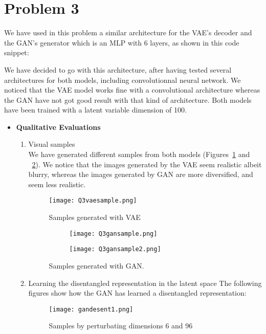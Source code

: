 \section*{Problem 3}
We have used in this problem a similar architecture for the VAE's decoder and the GAN's generator which is an MLP with 6 layers, as shown in this code snippet:


We have decided to go with this architecture, after having tested several architectures for both models, including convolutionnal neural network. We noticed that the VAE model works fine with a convolutional architecture whereas the GAN have not got good result with that kind of architecture. Both models have been trained with a latent variable dimension of 100.

\begin{itemize}
\item[A.] {\textbf{Qualitative Evaluations}}\\
\begin{enumerate}
	\item[1.]{Visual samples}\\
	We have generated different samples from both models (Figures~\ref{fig:q3vae} and ~\ref{fig:q3gan}). We notice that the images generated by the VAE seem realistic albeit blurry, whereas the images generated by GAN are more diversified, and seem less realistic. 
	\begin{figure}[H]
		\centering
		\texttt{[image: Q3vaesample.png]}
		\caption{Samples generated with VAE}
		\label{fig:q3vae}
	\end{figure}
	
	
	\begin{figure}[H]
		\centering
		\begin{subfigure}[b]{0.4\linewidth}
			\texttt{[image: Q3gansample.png]}
		\end{subfigure}
		\begin{subfigure}[b]{0.4\linewidth}
			\texttt{[image: Q3gansample2.png]}
		\end{subfigure}
		\caption{Samples generated with GAN.}
		\label{fig:q3gan}
	\end{figure}

\item[2.]{Learning the disentangled representation in the latent space}
The following figures show how the GAN has learned a disentangled representation:
\begin{figure}[H]
	\centering
	\texttt{[image: gandesent1.png]}
	\caption{Samples by perturbating dimensions 6 and 96}
	\label{fig:des1}
\end{figure}


\end{enumerate}
\end{itemize}
